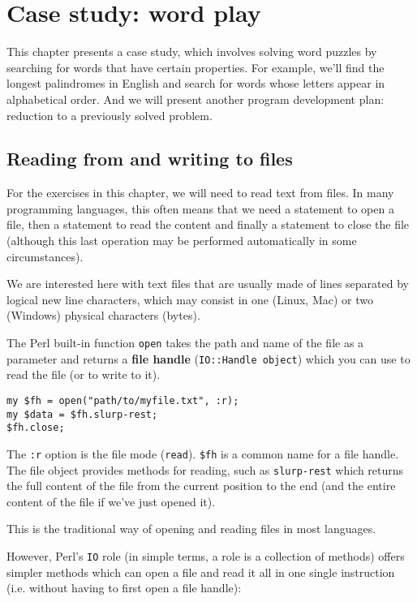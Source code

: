 
\chapter{Case study: word play}
\label{wordplay}

This chapter presents a case study, which involves
solving word puzzles by searching for words that have certain
properties.  For example, we'll find the longest palindromes
in English and search for words whose letters appear in
alphabetical order.  And we will present another program 
development plan: reduction to a previously solved problem.


\section{Reading from and writing to files}

For the exercises in this chapter, we will need to read 
text from files. In many programming languages, this often 
means that we need a statement to open a file, then a statement 
to read the content and finally a statement to close the file 
(although this last operation may be performed automatically 
in some circumstances).

We are interested here with text files that are usually 
made of lines separated by logical new line characters,
which may consist in one (Linux, Mac) or two (Windows) 
physical characters (bytes). 

The Perl built-in function {\tt open} takes the path and 
name of the file as a parameter and returns a {\bf file 
handle} ({\tt IO::Handle object}) which you can use to read 
the file (or to write to it).

\begin{verbatim}
my $fh = open("path/to/myfile.txt", :r);
my $data = $fh.slurp-rest;
$fh.close;
\end{verbatim}
%
The {\tt :r} option is the file mode ({\tt read}). {\tt \$fh} is a common 
name for a file handle.  The file object provides methods 
for reading, such as {\tt slurp-rest} which returns the 
full content of the file from the current position to the 
end (and the entire content of the file if we've just 
opened it).

This is the traditional way of opening and reading files 
in most languages.

However, Perl's {\tt IO} role (in simple terms, a role is 
a collection of methods) offers simpler methods which 
can open a file and read it all in one single instruction (i.e. 
without having to first open a file handle):

